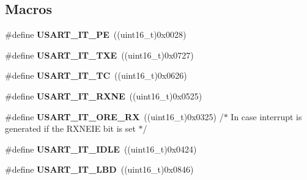 \subsection*{Macros}
\begin{DoxyCompactItemize}
\item 
\mbox{\label{group___u_s_a_r_t___interrupt__definition_gae607c28a462c224c575b7541dc4f7067}} 
\#define {\bfseries U\+S\+A\+R\+T\+\_\+\+I\+T\+\_\+\+PE}~((uint16\+\_\+t)0x0028)
\item 
\mbox{\label{group___u_s_a_r_t___interrupt__definition_gab18d0fe889204a4c34f6d5817fb5147d}} 
\#define {\bfseries U\+S\+A\+R\+T\+\_\+\+I\+T\+\_\+\+T\+XE}~((uint16\+\_\+t)0x0727)
\item 
\mbox{\label{group___u_s_a_r_t___interrupt__definition_ga748e86162cc110513330079982821c39}} 
\#define {\bfseries U\+S\+A\+R\+T\+\_\+\+I\+T\+\_\+\+TC}~((uint16\+\_\+t)0x0626)
\item 
\mbox{\label{group___u_s_a_r_t___interrupt__definition_gacdd49b93072655a21a63a35e6431f8ae}} 
\#define {\bfseries U\+S\+A\+R\+T\+\_\+\+I\+T\+\_\+\+R\+X\+NE}~((uint16\+\_\+t)0x0525)
\item 
\mbox{\label{group___u_s_a_r_t___interrupt__definition_gaad8fd44c80b30285dc3088a0b3aa5bd9}} 
\#define {\bfseries U\+S\+A\+R\+T\+\_\+\+I\+T\+\_\+\+O\+R\+E\+\_\+\+RX}~((uint16\+\_\+t)0x0325) /$\ast$ In case interrupt is generated if the R\+X\+N\+E\+I\+E bit is set $\ast$/
\item 
\mbox{\label{group___u_s_a_r_t___interrupt__definition_ga5d85aab24b7b2dfddb61ba2a49fa6185}} 
\#define {\bfseries U\+S\+A\+R\+T\+\_\+\+I\+T\+\_\+\+I\+D\+LE}~((uint16\+\_\+t)0x0424)
\item 
\mbox{\label{group___u_s_a_r_t___interrupt__definition_ga063628e16cdda199b07d380421afc4a5}} 
\#define {\bfseries U\+S\+A\+R\+T\+\_\+\+I\+T\+\_\+\+L\+BD}~((uint16\+\_\+t)0x0846)
\item 
\mbox{\label{group___u_s_a_r_t___interrupt__definition_gab49efbefaca2921e8cbe8f5146e99dbd}} 

\end{DoxyCompactItemize}
